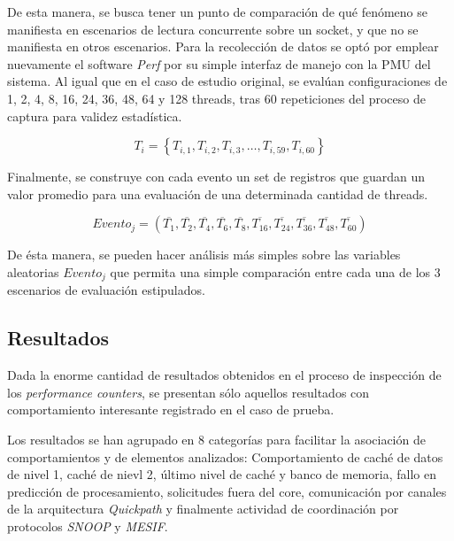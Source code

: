 De esta manera, se busca tener un punto de comparación de qué fenómeno se manifiesta en escenarios de lectura concurrente sobre un socket, y que no se manifiesta en otros escenarios. Para la recolección de datos se optó por emplear nuevamente el software \emph{Perf} por su simple interfaz de manejo con la PMU del sistema. Al igual que en el caso de estudio original, se evalúan configuraciones de 1, 2, 4, 8, 16, 24, 36, 48, 64 y 128 threads, tras 60 repeticiones del proceso de captura para validez estadística. 

\begin{equation}
T_i = \left\{ T_{i,1},T_{i,2},T_{i,3}, \dots ,T_{i,59}, T_{i,60}\right\} 
\end{equation}

Finalmente, se construye con cada evento un set de registros que guardan un valor promedio para una evaluación de una determinada cantidad de threads.

\begin{equation}
Evento_j = \left(\overline{T_{1}}, \overline{T_{2}}, \overline{T_{4}}, \overline{T_{6}}, \overline{T_{8}}, \overline{T_{16}}, \overline{T_{24}}, \overline{T_{36}}, \overline{T_{48}}, \overline{T_{60}}\right)
\end{equation}

De ésta manera, se pueden hacer análisis más simples sobre las variables aleatorias $Evento_j$ que permita una simple comparación entre cada una de los 3 escenarios de evaluación estipulados.

\subsection{Resultados}
Dada la enorme cantidad de resultados obtenidos en el proceso de inspección de los \emph{performance counters}, se presentan sólo aquellos resultados con comportamiento interesante registrado en el caso de prueba.

Los resultados se han agrupado en 8 categorías para facilitar la asociación de comportamientos y de elementos analizados: Comportamiento de caché de datos de nivel 1, caché de nievl 2, último nivel de caché y banco de memoria, fallo en predicción de procesamiento, solicitudes fuera del core, comunicación por canales de la arquitectura \emph{Quickpath} y finalmente actividad de coordinación por protocolos \emph{SNOOP} y \emph{MESIF}.

